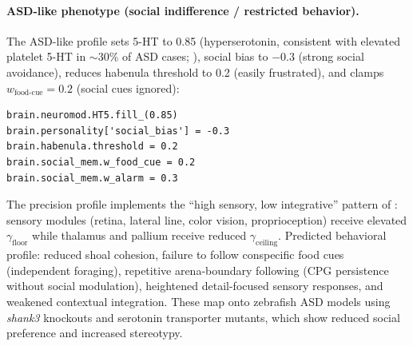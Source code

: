 \documentclass[12pt]{article}
\begin{document}
\paragraph{ASD-like phenotype (social indifference / restricted behavior).}
The ASD-like profile sets 5-HT to 0.85 (hyperserotonin, consistent with
elevated platelet 5-HT in $\sim$30\% of ASD cases; \citealt{makkonen2008}),
social bias to $-0.3$ (strong social avoidance), reduces habenula threshold
to 0.2 (easily frustrated), and clamps $w_{\text{food-cue}} = 0.2$
(social cues ignored):
\begin{verbatim}
brain.neuromod.HT5.fill_(0.85)
brain.personality['social_bias'] = -0.3
brain.habenula.threshold = 0.2
brain.social_mem.w_food_cue = 0.2
brain.social_mem.w_alarm = 0.3
\end{verbatim}
The precision profile implements the ``high sensory, low integrative''
pattern of \citet{lawson2014}: sensory modules (retina, lateral line,
color vision, proprioception) receive elevated $\gamma_\text{floor}$
while thalamus and pallium receive reduced $\gamma_\text{ceiling}$.
Predicted behavioral profile: reduced shoal cohesion, failure to follow
conspecific food cues (independent foraging), repetitive arena-boundary
following (CPG persistence without social modulation), heightened
detail-focused sensory responses, and weakened contextual integration.
These map onto zebrafish ASD models using \textit{shank3} knockouts
\citep{chen2010} and serotonin transporter mutants, which show reduced
social preference and increased stereotypy.
\end{document}
